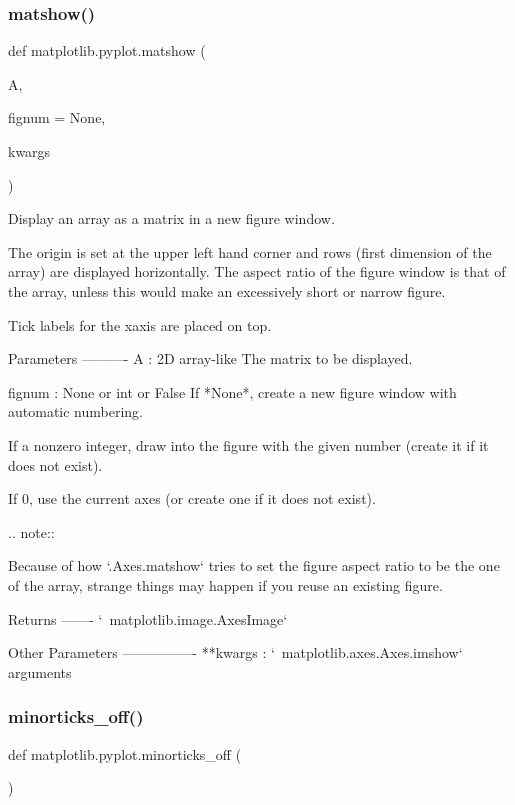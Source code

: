 \subsubsection{\texorpdfstring{matshow()}{matshow()}}
{\footnotesize\ttfamily def matplotlib.\+pyplot.\+matshow (\begin{DoxyParamCaption}\item[{}]{A,  }\item[{}]{fignum = {\ttfamily None},  }\item[{}]{kwargs }\end{DoxyParamCaption})}

\begin{DoxyVerb}Display an array as a matrix in a new figure window.

The origin is set at the upper left hand corner and rows (first
dimension of the array) are displayed horizontally.  The aspect
ratio of the figure window is that of the array, unless this would
make an excessively short or narrow figure.

Tick labels for the xaxis are placed on top.

Parameters
----------
A : 2D array-like
    The matrix to be displayed.

fignum : None or int or False
    If *None*, create a new figure window with automatic numbering.

    If a nonzero integer, draw into the figure with the given number
    (create it if it does not exist).

    If 0, use the current axes (or create one if it does not exist).

    .. note::

       Because of how `.Axes.matshow` tries to set the figure aspect
       ratio to be the one of the array, strange things may happen if you
       reuse an existing figure.

Returns
-------
`~matplotlib.image.AxesImage`

Other Parameters
----------------
**kwargs : `~matplotlib.axes.Axes.imshow` arguments\end{DoxyVerb}
 \mbox{\label{namespacematplotlib_1_1pyplot_a7d84148f3be369c4d9b014b567272754}} 
\subsubsection{\texorpdfstring{minorticks\+\_\+off()}{minorticks\_off()}}
{\footnotesize\ttfamily def matplotlib.\+pyplot.\+minorticks\+\_\+off (\begin{DoxyParamCaption}{ }\end{DoxyParamCaption})}

